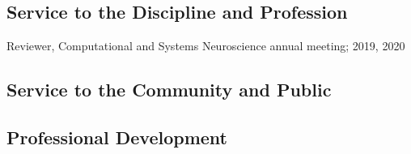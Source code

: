 \documentclass[a4paper,9pt]{extarticle}
\begin{document}
    \subsection*{Service to the Discipline and Profession}
        Reviewer, Computational and Systems Neuroscience annual meeting; 2019, 2020 \\
    \subsection*{Service to the Community and Public}
        \lipsum[1][3-9]
    \subsection*{Professional Development}
    \lipsum[1][3-9]

\end{document}
